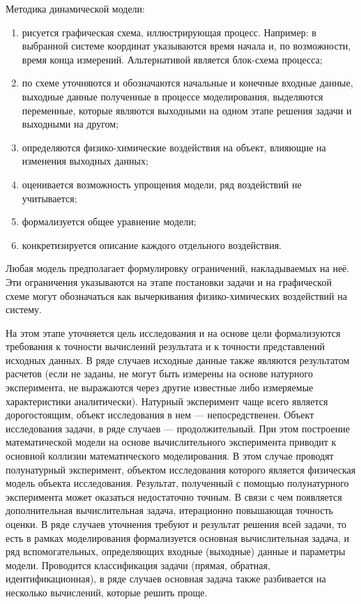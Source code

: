 \documentclass[12pt]{article}
\begin{document}
Методика динамической модели:
\begin{enumerate}
    \item рисуется графическая схема, иллюстрирующая процесс. Например: в выбранной системе координат указываются время начала и, по возможности, время конца измерений. Альтернативой является блок-схема процесса;
    \item по схеме уточняются и обозначаются начальные и конечные входные данные, выходные данные полученные в процессе моделирования, выделяются переменные, которые являются выходными на одном этапе решения задачи и выходными на другом;
    \item определяются физико-химические воздействия на объект, влияющие на изменения выходных данных;
    \item оценивается возможность упрощения модели, ряд воздействий не учитывается;
    \item формализуется общее уравнение модели;
    \item конкретизируется описание каждого отдельного воздействия.
\end{enumerate}

Любая модель предполагает формулировку ограничений, накладываемых на неё. Эти ограничения указываются на этапе постановки задачи и на графической схеме могут обозначаться как вычеркивания физико-химических воздействий на систему.

На этом этапе уточняется цель исследования и на основе цели формализуются требования к точности вычислений результата и к точности представлений исходных данных. В ряде случаев исходные данные также являются результатом расчетов (если не заданы, не могут быть измерены на основе натурного эксперимента, не выражаются через другие известные либо измеряемые характеристики аналитически). Натурный эксперимент чаще всего является дорогостоящим, объект исследования в нем --- непосредственен. Объект исследования задачи, в ряде случаев --- продолжительный. При этом построение математической модели на основе вычислительного эксперимента приводит к основной коллизии математического моделирования. В этом случае проводят полунатурный эксперимент, объектом исследования которого является физическая модель объекта исследования. Результат, полученный с помощью полунатурного  эксперимента может оказаться недостаточно точным. В связи с чем появляется дополнительная вычислительная задача, итерационно повышающая точность оценки. В ряде случаев уточнения требуют и результат решения всей задачи, то есть в рамках моделирования формализуется основная вычислительная задача, и ряд вспомогательных, определяющих входные (выходные) данные и параметры модели. Проводится классификация задачи (прямая, обратная, идентификационная), в ряде случаев основная задача также разбивается на несколько вычислений, которые решить проще.
\end{document}
